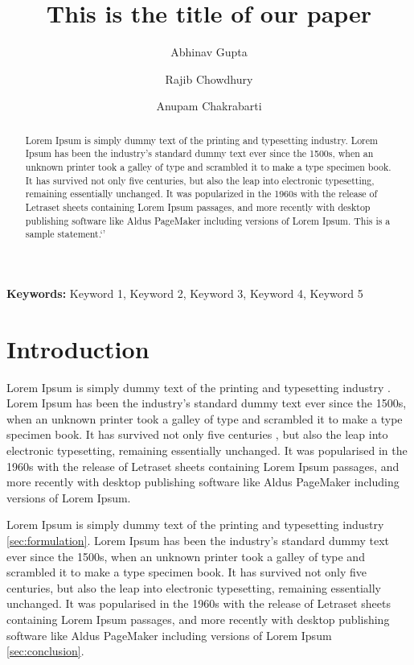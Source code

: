 \documentclass[10pt,a4paper, oneside]{article}
\providecommand{\keywords}[1]{\textbf{{Keywords:}} #1}
\theoremstyle{remark}
\begin{document}
	\title{This is the title of our paper}
	\author[1]{Abhinav Gupta}
	\author[1]{Rajib Chowdhury}
	\author[1]{Anupam Chakrabarti}

	\thispagestyle{empty}
	\newpage

	\maketitle
	\setcounter{page}{1}
	\linenumbers

	\begin{abstract}
		Lorem Ipsum is simply dummy text of the printing and typesetting industry. Lorem Ipsum has been the industry's standard dummy text ever since the 1500s, when an unknown printer took a galley of type and scrambled it to make a type specimen book. It has survived not only five centuries, but also the leap into electronic typesetting, remaining essentially unchanged. It was popularized in the 1960s with the release of Letraset sheets containing Lorem Ipsum passages, and more recently with desktop publishing software like Aldus PageMaker including versions of Lorem Ipsum. This is a sample statement.`'
	\end{abstract}
	\keywords{Keyword 1, Keyword 2, Keyword 3, Keyword 4, Keyword 5}
	\section{Introduction}
	Lorem Ipsum is simply dummy text of the printing and typesetting industry \citep{gupta55lineCodeLargescale2020}. Lorem Ipsum has been the industry's standard dummy text ever since the 1500s, when an unknown printer took a galley of type and scrambled it to make a type specimen book. It has survived not only five centuries \citep{guptaAutoadaptiveSubsteppingAlgorithm2020a,mandalLengthScaleInsensitive2020a}, but also the leap into electronic typesetting, remaining essentially unchanged. It was popularised in the 1960s with the release of Letraset sheets containing Lorem Ipsum passages, and more recently with desktop publishing software like Aldus PageMaker including versions of Lorem Ipsum.

	Lorem Ipsum is simply dummy text of the printing and typesetting industry \cref{sec:formulation}. Lorem Ipsum  has been the industry's standard dummy text ever since the 1500s, when an unknown printer took a galley of type and scrambled it to make a type specimen book. It has survived not only five centuries, but also the leap into electronic typesetting, remaining essentially unchanged. It was popularised in the 1960s with the release of Letraset sheets containing Lorem Ipsum passages, and more recently with desktop publishing software like Aldus PageMaker including versions of Lorem Ipsum \cref{sec:conclusion}.
\end{document}
